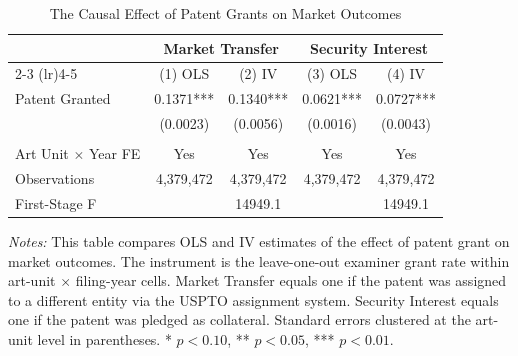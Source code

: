 \begin{table}[H]
\centering
\caption{The Causal Effect of Patent Grants on Market Outcomes}
\label{tab:iv}
\begin{threeparttable}
\begin{tabular}{lcccc}
\toprule
 & \multicolumn{2}{c}{Market Transfer} & \multicolumn{2}{c}{Security Interest} \\
\cmidrule(lr){2-3} \cmidrule(lr){4-5}
 & (1) OLS & (2) IV & (3) OLS & (4) IV \\
\midrule
Patent Granted & 0.1371*** & 0.1340*** & 0.0621*** & 0.0727*** \\
 & (0.0023) & (0.0056) & (0.0016) & (0.0043) \\
\\
Art Unit $\times$ Year FE & Yes & Yes & Yes & Yes \\
Observations & 4,379,472 & 4,379,472 & 4,379,472 & 4,379,472 \\
First-Stage F & & 14949.1 & & 14949.1 \\
\bottomrule
\end{tabular}
\begin{tablenotes}[flushleft]
\small
\item \textit{Notes:} This table compares OLS and IV estimates of the effect of patent grant on market outcomes. The instrument is the leave-one-out examiner grant rate within art-unit $\times$ filing-year cells. Market Transfer equals one if the patent was assigned to a different entity via the USPTO assignment system. Security Interest equals one if the patent was pledged as collateral. Standard errors clustered at the art-unit level in parentheses. * $p<0.10$, ** $p<0.05$, *** $p<0.01$.
\end{tablenotes}
\end{threeparttable}
\end{table}
